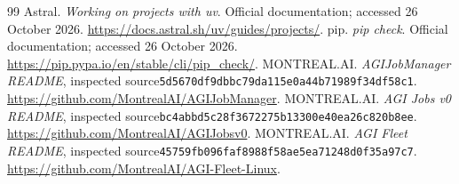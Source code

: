 \documentclass[11pt,letterpaper]{article}
\newcommand{\hash}[1]{\texttt{\scriptsize #1}}
\begin{document}
\begin{thebibliography}{99}
 Astral. \emph{Working on projects with uv}. Official documentation; accessed 26 October 2026. \url{https://docs.astral.sh/uv/guides/projects/}.
 pip. \emph{pip check}. Official documentation; accessed 26 October 2026. \url{https://pip.pypa.io/en/stable/cli/pip_check/}.
 MONTREAL.AI. \emph{AGIJobManager README}, inspected source\newline\hash{5d5670df9dbbc79da115e0a44b71989f34df58c1}. \url{https://github.com/MontrealAI/AGIJobManager}.
 MONTREAL.AI. \emph{AGI Jobs v0 README}, inspected source\newline\hash{bc4abbd5c28f3672275b13300e40ea26c820b8ee}. \url{https://github.com/MontrealAI/AGIJobsv0}.
 MONTREAL.AI. \emph{AGI Fleet README}, inspected source\newline\hash{45759fb096faf8988f58ae5ea71248d0f35a97c7}. \url{https://github.com/MontrealAI/AGI-Fleet-Linux}.
\end{thebibliography}
\end{document}
